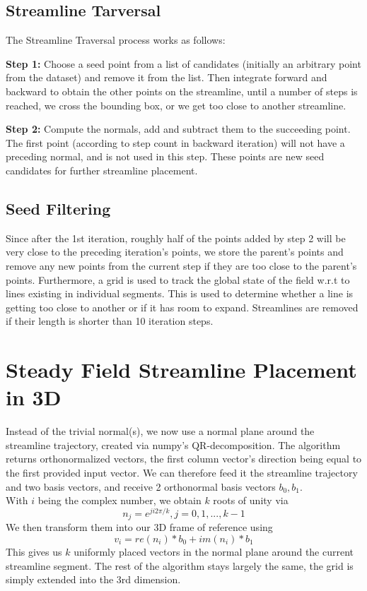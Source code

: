 \subsection{Streamline Tarversal}
The Streamline Traversal process works as follows:
\begin{itemize}
    \begin{minipage}{.6\textwidth}
    \item \textbf{Step 1:}
    Choose a seed point from a list of candidates (initially an arbitrary point from the dataset) and remove it from the list.
    Then integrate forward and backward to obtain the other points on the streamline, until
    a number of steps is reached, we cross the bounding box, or we get too close to another streamline.
    \item \textbf{Step 2:}
    Compute the normals, add and subtract them to the succeeding point. The first point (according to step count in backward iteration) will not have a preceding normal, and is not used in this step. These points are new seed candidates for further streamline placement.
    \end{minipage}
    \begin{minipage}{.3\textwidth}
    
    \end{minipage}
\end{itemize}
\subsection{Seed Filtering}
Since after the 1st iteration, roughly half of the points added by step 2 will be very close to the preceding iteration's points, we store the parent's points and remove any new points from the current step if they are too close to the parent's points.
Furthermore, a grid is used to track the global state of the field w.r.t to lines existing in individual segments.
This is used to determine whether a line is getting too close to another or if it has room to expand. Streamlines are removed if their length is shorter than 10 iteration steps.
\section{Steady Field Streamline Placement in 3D}
Instead of the trivial normal(s), we now use a normal plane around the streamline trajectory, created via numpy's QR-decomposition. The algorithm returns orthonormalized vectors, the first column vector's direction being equal to the first provided input vector.
We can therefore feed it the streamline trajectory and two basis vectors, and receive 2 orthonormal basis vectors $b_0, b_1$.\\
With $i$ being the complex number, we obtain $k$ roots of unity via \[n_j = e^{ji2\pi/k}, j = 0, 1, ..., k-1\]
We then transform them into our 3D frame of reference using \[v_i = re(n_i)*b_0 + im(n_i)*b_1 \] This gives us $k$ uniformly placed  vectors in the normal plane around the current streamline segment. The rest of the algorithm stays largely the same, the grid is simply extended into the 3rd dimension.
